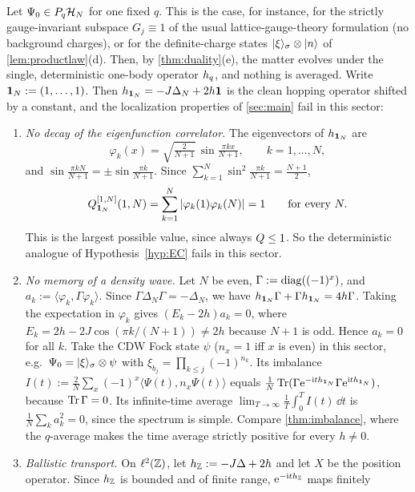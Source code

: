 \begin{remark}\label{rem:gaussproj}
Let $\Psi_0\in P_q\mathcal{H}_N$ for one fixed $q$.  This is the case, for instance, for the strictly
gauge-invariant subspace $G_j\equiv1$ of the usual lattice-gauge-theory formulation (no background
charges), or for the definite-charge states $|\xi\rangle_\sigma\otimes|n\rangle$ of
\cref{lem:productlaw}(d).  Then, by \cref{thm:duality}(e), the matter evolves under the single,
deterministic one-body operator $h_{q}$, and nothing is averaged.  Write $\mathbf{1}_N:=(1,\dots,1)$.  Then $h_{\mathbf{1}_N}=-J\Delta_N+2h\mathbf{1}$ is the clean hopping
operator shifted by a constant, and the localization properties of \cref{sec:main} fail in this sector:
\begin{enumerate}[label=(\roman*)]
\item \emph{No decay of the eigenfunction correlator.}  The eigenvectors of $h_{\mathbf{1}_N}$ are
\[
  \varphi_k(x)=\sqrt{\tfrac{2}{N+1}}\,\sin\tfrac{\pi kx}{N+1},\qquad k=1,\dots,N,
\]
and $\sin\frac{\pi kN}{N+1}=\pm\sin\frac{\pi k}{N+1}$.  Since
$\sum_{k=1}^N\sin^2\frac{\pi k}{N+1}=\frac{N+1}{2}$,
\[
  Q^{[1,N]}_{\mathbf{1}_N}(1,N)=\sum_{k=1}^N\left|\varphi_k(1)\varphi_k(N)\right|=1\qquad\text{for every }N .
\]
This is the largest possible value, since always $Q\le1$.  So the deterministic analogue of
Hypothesis~\ref{hyp:EC} fails in this sector.
\item \emph{No memory of a density wave.}  Let $N$ be even, $\Gamma:=\operatorname{diag}((-1)^x)$, and
$a_k:=\langle\varphi_k,\Gamma\varphi_k\rangle$.  Since $\Gamma\Delta_N\Gamma=-\Delta_N$, we have
$h_{\mathbf{1}_N}\Gamma+\Gamma h_{\mathbf{1}_N}=4h\Gamma$.  Taking the expectation in $\varphi_k$ gives
$(E_k-2h)a_k=0$, where $E_k=2h-2J\cos(\pi k/(N+1))\neq2h$ because $N+1$ is odd.  Hence $a_k=0$ for
all $k$.  Take the CDW Fock state $\psi$ ($n_x=1$ iff $x$ is even) in this sector, e.g.\
$\Psi_0=|\xi\rangle_\sigma\otimes\psi$ with $\xi_{b_j}=\prod_{k\le j}(-1)^{n_k}$.  Its imbalance
$I(t):=\frac2N\sum_x(-1)^x\langle\Psi(t),n_x\Psi(t)\rangle$ equals
$\frac1N\operatorname{Tr}(\Gamma\mathrm{e}^{-\mathrm{i} th_{\mathbf{1}_N}}\Gamma\mathrm{e}^{\mathrm{i} th_{\mathbf{1}_N}})$, because $\operatorname{Tr}\Gamma=0$.  Its infinite-time
average $\lim_{T\to\infty}\frac1T\int_0^TI(t)\,\dd t$ is $\frac1N\sum_ka_k^2=0$, since the spectrum is simple.  Compare \cref{thm:imbalance}, where
the $q$-average makes the time average strictly positive for every $h\neq0$.
\item \emph{Ballistic transport.}  On $\ell^2(\mathbb{Z})$, let $h_{\mathbb{Z}}:=-J\Delta+2h$ and let $X$ be the
position operator.  Since $h_{\mathbb{Z}}$ is bounded and of finite range, $\mathrm{e}^{-\mathrm{i} th_{\mathbb{Z}}}$ maps finitely

\end{enumerate}
\end{remark}
